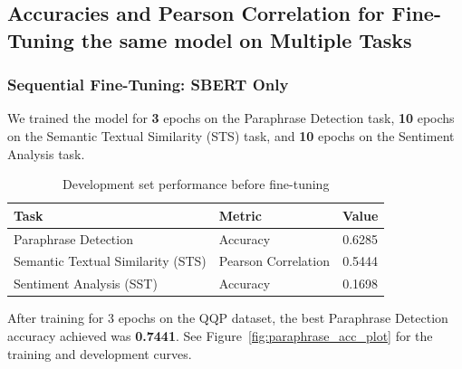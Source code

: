 
\subsection{Accuracies and Pearson Correlation for Fine-Tuning the same model on Multiple Tasks}
\subsubsection{Sequential Fine-Tuning: SBERT Only}

We trained the model for \textbf{3} epochs on the Paraphrase Detection task, \textbf{10} epochs on the Semantic Textual Similarity (STS) task, and \textbf{10} epochs on the Sentiment Analysis task.

\begin{table}[H]
    \centering
    \begin{tabular}{|l|l|c|}
    \hline
    \textbf{Task} & \textbf{Metric} & \textbf{Value} \\ \hline
    Paraphrase Detection & Accuracy & 0.6285 \\ \hline
    Semantic Textual Similarity (STS) & Pearson Correlation & 0.5444 \\ \hline
    Sentiment Analysis (SST) & Accuracy & 0.1698 \\ \hline
    \end{tabular}
    \caption{Development set performance before fine-tuning}
    \label{tab:pre_finetuning_metrics}
\end{table}

After training for 3 epochs on the QQP dataset, the best Paraphrase Detection accuracy achieved was \textbf{0.7441}. See Figure~\ref{fig:paraphrase_acc_plot} for the training and development curves.

